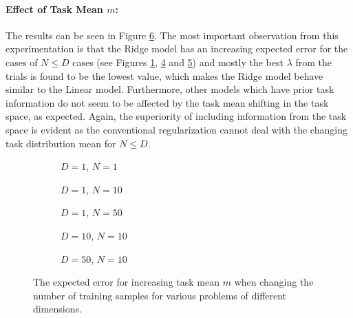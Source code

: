 \paragraph{Effect of Task Mean $m$:} The results can be seen in Figure \ref{fig:linear-m}. The most important observation from this experimentation is that the Ridge model has an increasing expected error for the cases of $N\leq D$ cases (see Figures \ref{fig:linear-m-N-1-D-1}, \ref{fig:linear-m-N-10-D-10} and \ref{fig:linear-m-N-10-D-50}) and mostly the best $\lambda$ from the trials is found to be the lowest value, which makes the Ridge model behave similar to the Linear model. Furthermore, other models which have prior task information do not seem to be affected by the task mean shifting in the task space, as expected. Again, the superiority of including information from the task space is evident as the conventional regularization cannot deal with the changing task distribution mean for $N\leq D$.

\begin{figure}[!h]
  \centering
    \begin{subfigure}{0.32\textwidth}
      \centering
      \caption{$D=1$, $N=1$}
      \label{fig:linear-m-N-1-D-1}
    \end{subfigure}
    \begin{subfigure}{0.32\textwidth}
      \centering
      \caption{$D=1$, $N=10$}
      \label{fig:linear-m-N-10-D-1}
    \end{subfigure}
    \begin{subfigure}{0.32\textwidth}
      \centering
      \caption{$D=1$, $N=50$}
      \label{fig:linear-m-N-50-D-1}
    \end{subfigure}

    \begin{subfigure}{0.32\textwidth}
      \centering
      \caption{$D=10$, $N=10$}
      \label{fig:linear-m-N-10-D-10}
    \end{subfigure}
    \begin{subfigure}{0.32\textwidth}
      \centering
      \caption{$D=50$, $N=10$}
      \label{fig:linear-m-N-10-D-50}
    \end{subfigure}  

  \caption{The expected error for increasing task mean $m$ when changing the number of training samples for various problems of different dimensions.}
  \label{fig:linear-m}
\end{figure}

